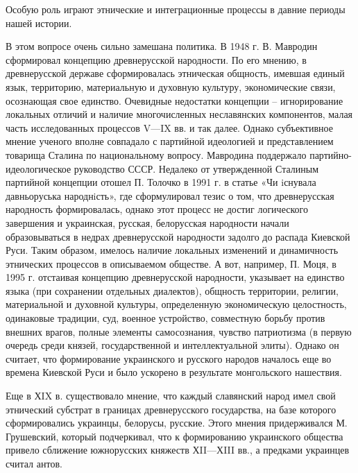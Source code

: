 Особую роль играют этнические и интеграционные процессы в давние периоды нашей
истории.

В этом вопросе очень сильно замешана политика. В 1948 г. В. Мавродин
сформировал концепцию древнерусской народности. По его мнению, в древнерусской
державе сформировалась этническая общность, имевшая единый язык, территорию,
материальную и духовную культуру, экономические связи, осознающая свое
единство. Очевидные недостатки концепции – игнорирование локальных отличий и
наличие многочисленных неславянских компонентов, малая часть исследованных
процессов V—IX вв. и так далее. Однако субъективное мнение ученого вполне
совпадало с партийной идеологией и представлением товарища Сталина по
национальному вопросу. Мавродина поддержало партийно-идеологическое руководство
СССР. Недалеко от утвержденной Сталиным партийной концепции отошел П. Толочко в
1991 г. в статье «Чи iснувала давньоруська народнiсть», где сформулировал тезис
о том, что древнерусская народность формировалась, однако этот процесс не
достиг логического завершения и украинская, русская, белорусская народности
начали образовываться в недрах древнерусской народности задолго до распада
Киевской Руси. Таким образом, имелось наличие локальных изменений и
динамичность этнических процессов в описываемом обществе. А вот, например, П.
Моця, в 1995 г. отстаивая концепцию древнерусской народности, указывает на
единство языка (при сохранении отдельных диалектов), общность территории,
религии, материальной и духовной культуры, определенную экономическую
целостность, одинаковые традиции, суд, военное устройство, совместную борьбу
против внешних врагов, полные элементы самосознания, чувство патриотизма (в
первую очередь среди князей, государственной и интеллектуальной элиты). Однако
он считает, что формирование украинского и русского народов началось еще во
времена Киевской Руси и было ускорено в результате монгольского нашествия.

Еще в ХIX в. существовало мнение, что каждый славянский народ имел свой
этнический субстрат в границах древнерусского государства, на базе которого
сформировались украинцы, белорусы, русские. Этого мнения придерживался М.
Грушевский, который подчеркивал, что к формированию украинского общества
привело сближение южнорусских княжеств ХII—ХIII вв., а предками украинцев
считал антов.

